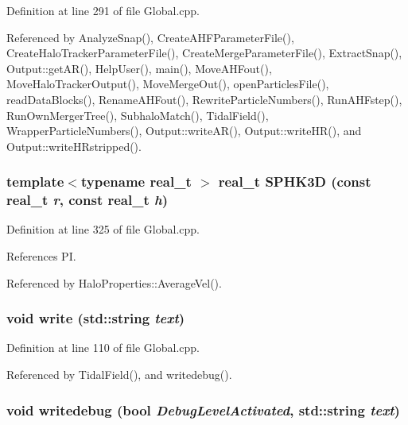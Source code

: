 Definition at line 291 of file Global.cpp.



Referenced by AnalyzeSnap(), CreateAHFParameterFile(), CreateHaloTrackerParameterFile(), CreateMergeParameterFile(), ExtractSnap(), Output::getAR(), HelpUser(), main(), MoveAHFout(), MoveHaloTrackerOutput(), MoveMergeOut(), openParticlesFile(), readDataBlocks(), RenameAHFout(), RewriteParticleNumbers(), RunAHFstep(), RunOwnMergerTree(), SubhaloMatch(), TidalField(), WrapperParticleNumbers(), Output::writeAR(), Output::writeHR(), and Output::writeHRstripped().

\subsubsection[{SPHK3D}]{\setlength{\rightskip}{0pt plus 5cm}template$<$typename real\_\-t $>$ real\_\-t SPHK3D (const real\_\-t {\em r}, \/  const real\_\-t {\em h})}\label{Global_8h_a0cb8e9ba7bd0b1861c15a42aa799dcd4}


Definition at line 325 of file Global.cpp.



References PI.



Referenced by HaloProperties::AverageVel().

\subsubsection[{write}]{\setlength{\rightskip}{0pt plus 5cm}void write (std::string {\em text})}\label{Global_8h_aadd6ff8eac457116cc843c4b98bc0636}


Definition at line 110 of file Global.cpp.



Referenced by TidalField(), and writedebug().

\subsubsection[{writedebug}]{\setlength{\rightskip}{0pt plus 5cm}void writedebug (bool {\em DebugLevelActivated}, \/  std::string {\em text})}\label{Global_8h_a865c3c98145e9535ae7575ff0161119d}


